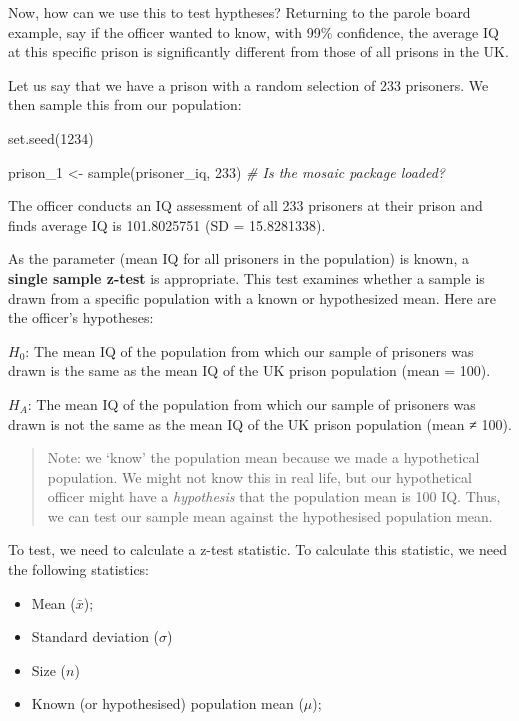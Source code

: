 \documentclass[
]{book}
\newenvironment{Shaded}{\begin{snugshade}}{\end{snugshade}}
\newcommand{\CommentTok}[1]{\textcolor[rgb]{0.56,0.35,0.01}{\textit{#1}}}
\newcommand{\DecValTok}[1]{\textcolor[rgb]{0.00,0.00,0.81}{#1}}
\newcommand{\FunctionTok}[1]{\textcolor[rgb]{0.00,0.00,0.00}{#1}}
\newcommand{\NormalTok}[1]{#1}
\newcommand{\OtherTok}[1]{\textcolor[rgb]{0.56,0.35,0.01}{#1}}
\providecommand{\tightlist}{%
  \setlength{\itemsep}{0pt}\setlength{\parskip}{0pt}}
\begin{document}
Now, how can we use this to test hyptheses? Returning to the parole board example, say if the officer wanted to know, with 99\% confidence, the average IQ at this specific prison is significantly different from those of all prisons in the UK.

Let us say that we have a prison with a random selection of 233 prisoners. We then sample this from our population:

\begin{Shaded}
\begin{Highlighting}[]
\FunctionTok{set.seed}\NormalTok{(}\DecValTok{1234}\NormalTok{)}

\NormalTok{prison\_1 }\OtherTok{\textless{}{-}} \FunctionTok{sample}\NormalTok{(prisoner\_iq, }\DecValTok{233}\NormalTok{) }\CommentTok{\# Is the \textquotesingle{}mosaic\textquotesingle{} package loaded?}
\end{Highlighting}
\end{Shaded}

The officer conducts an IQ assessment of all 233 prisoners at their prison and finds average IQ is 101.8025751 (SD = 15.8281338).

As the parameter (mean IQ for all prisoners in the population) is known, a \textbf{single sample z-test} is appropriate. This test examines whether a sample is drawn from a specific population with a known or hypothesized mean. Here are the officer's hypotheses:

\(H_0\): The mean IQ of the population from which our sample of prisoners was drawn is the same as the mean IQ of the UK prison population (mean = 100).

\(H_A\): The mean IQ of the population from which our sample of prisoners was drawn is not the same as the mean IQ of the UK prison population (mean ≠ 100).

\begin{quote}
Note: we `know' the population mean because we made a hypothetical population. We might not know this in real life, but our hypothetical officer might have a \emph{hypothesis} that the population mean is 100 IQ. Thus, we can test our sample mean against the hypothesised population mean.
\end{quote}

To test, we need to calculate a z-test statistic. To calculate this statistic, we need the following statistics:

\begin{itemize}
\tightlist
\item
  Mean (\(\bar{x}\));
\item
  Standard deviation (\(\sigma\))
\item
  Size (\(n\))
\item
  Known (or hypothesised) population mean (\(\mu\));
\end{itemize}
\end{document}
